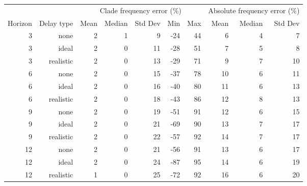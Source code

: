 
\begin{tabular*}{1.0\textwidth}{rrrrrrrrrr}
\toprule
        &            & \multicolumn{5}{c}{Clade frequency error (\%)} & \multicolumn{3}{c}{Absolute frequency error (\%)} \\
Horizon & Delay type & Mean & Median & Std Dev & Min & Max & Mean & Median & Std Dev \\
\midrule

3 & none & 2 & 1 & 9 & -24 & 44 & 6 & 4 & 7 \\
3 & ideal & 2 & 0 & 11 & -28 & 51 & 7 & 5 & 8 \\
3 & realistic & 2 & 0 & 13 & -29 & 71 & 9 & 7 & 10 \\
6 & none & 2 & 0 & 15 & -37 & 78 & 10 & 6 & 11 \\
6 & ideal & 2 & 0 & 16 & -40 & 80 & 11 & 6 & 13 \\
6 & realistic & 2 & 0 & 18 & -43 & 86 & 12 & 8 & 13 \\
9 & none & 2 & 0 & 19 & -51 & 91 & 12 & 6 & 15 \\
9 & ideal & 2 & 0 & 21 & -69 & 90 & 13 & 7 & 17 \\
9 & realistic & 2 & 0 & 22 & -57 & 92 & 14 & 7 & 17 \\
12 & none & 2 & 0 & 21 & -56 & 91 & 13 & 6 & 17 \\
12 & ideal & 2 & 0 & 24 & -87 & 95 & 14 & 6 & 19 \\
12 & realistic & 1 & 0 & 25 & -72 & 92 & 16 & 6 & 20 \\

\bottomrule
\end{tabular*}

